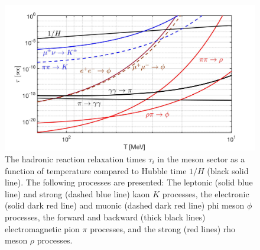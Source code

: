 \documentclass[universe,article,submit,moreauthors,pdftex,a4paper]{Definitions/mdpi}
\begin{document}
\begin{figure}[ht]
\centering
\includegraphics[width=1.0\linewidth]{./plots/Strangeness_Hubble_CTYang_V2.jpg}
\caption{The hadronic reaction relaxation times $\tau_{i}$ in the meson sector as a function of temperature compared to Hubble time $1/H$ (black solid line). The following processes are presented: The leptonic (solid blue line) and strong (dashed blue line) kaon $K$ processes, the electronic (solid dark red line) and muonic (dashed dark red line) phi meson $\phi$ processes, the forward and backward (thick black lines) electromagnetic pion $\pi$ processes, and the strong (red lines) rho meson $\rho$ processes.}
\label{reaction_time_tot}
\end{figure}
\end{document}
